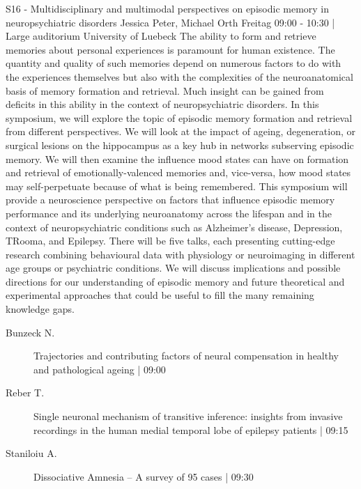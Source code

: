 
            \begin{symposium}
            {S16 - Multidisciplinary and multimodal perspectives on episodic memory in neuropsychiatric disorders}
            {Jessica Peter, Michael Orth }
            {Freitag 09:00 - 10:30 | Large auditorium}
            {University of Luebeck}
            The ability to form and retrieve memories about personal experiences is paramount for human existence. The quantity and quality of such memories depend on numerous factors to do with the experiences themselves but also with the complexities of the neuroanatomical basis of memory formation and retrieval. Much insight can be gained from deficits in this ability in the context of neuropsychiatric disorders. In this symposium, we will explore the topic of episodic memory formation and retrieval from different perspectives. We will look at the impact of ageing, degeneration, or surgical lesions on the hippocampus as a key hub in networks subserving episodic memory. We will then examine the influence mood states can have on formation and retrieval of emotionally-valenced memories and, vice-versa, how mood states may self-perpetuate because of what is being remembered.
This symposium will provide a neuroscience perspective on factors that influence episodic memory performance and its underlying neuroanatomy across the lifespan and in the context of neuropsychiatric conditions such as Alzheimer’s disease, Depression, TRooma, and Epilepsy. There will be five talks, each presenting cutting-edge research combining behavioural data with physiology or neuroimaging in different age groups or psychiatric conditions. We will discuss implications and possible directions for our understanding of episodic memory and future theoretical and experimental approaches that could be useful to fill the many remaining knowledge gaps.
            \begin{description}    
            
                \item [ Bunzeck N.] Trajectories and contributing factors of neural compensation in healthy and pathological ageing \textcolor{mygray}{ | 09:00}    
                
                \item [ Reber T.] Single neuronal mechanism of transitive inference: insights from invasive recordings in the human medial temporal lobe of epilepsy patients \textcolor{mygray}{ | 09:15}    
                
                \item [ Staniloiu A.] Dissociative Amnesia – A survey of 95 cases \textcolor{mygray}{ | 09:30}    
                

\end{description}
\end{symposium}
